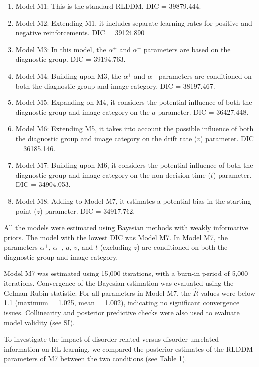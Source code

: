 \documentclass[
  man,floatsintext]{apa6}
\providecommand{\tightlist}{%
  \setlength{\itemsep}{0pt}\setlength{\parskip}{0pt}}
\begin{document}
\begin{enumerate}
\def\labelenumi{\arabic{enumi}.}
\tightlist
\item
  Model M1: This is the standard RLDDM. DIC = 39879.444.
\item
  Model M2: Extending M1, it includes separate learning rates for positive and negative reinforcements. DIC = 39124.890
\item
  Model M3: In this model, the \(\alpha^+\) and \(\alpha^-\) parameters are based on the diagnostic group. DIC = 39194.763.
\item
  Model M4: Building upon M3, the \(\alpha^+\) and \(\alpha^-\) parameters are conditioned on both the diagnostic group and image category. DIC = 38197.467.
\item
  Model M5: Expanding on M4, it considers the potential influence of both the diagnostic group and image category on the \(a\) parameter. DIC = 36427.448.
\item
  Model M6: Extending M5, it takes into account the possible influence of both the diagnostic group and image category on the drift rate (\(v\)) parameter. DIC = 36185.146.
\item
  Model M7: Building upon M6, it considers the potential influence of both the diagnostic group and image category on the non-decision time (\(t\)) parameter. DIC = 34904.053.
\item
  Model M8: Adding to Model M7, it estimates a potential bias in the starting point (\(z\)) parameter. DIC = 34917.762.
\end{enumerate}

All the models were estimated using Bayesian methods with weakly informative priors. The model with the lowest DIC was Model M7. In Model M7, the parameters \(\alpha^+\), \(\alpha^-\), \(a\), \(v\), and \(t\) (excluding \(z\)) are conditioned on both the diagnostic group and image category.

Model M7 was estimated using 15,000 iterations, with a burn-in period of 5,000 iterations. Convergence of the Bayesian estimation was evaluated using the Gelman-Rubin statistic. For all parameters in Model M7, the \(\hat{R}\) values were below 1.1 (maximum = 1.025, mean = 1.002), indicating no significant convergence issues. Collinearity and posterior predictive checks were also used to evaluate model validity (see SI).

To investigate the impact of disorder-related versus disorder-unrelated information on RL learning, we compared the posterior estimates of the RLDDM parameters of M7 between the two conditions (see Table 1).
\end{document}

